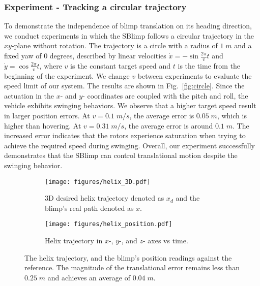 \documentclass[conference]{ieeeconf}
\begin{document}
\subsubsection{Experiment - Tracking a circular trajectory}
{
To demonstrate the independence of blimp translation on its heading direction, we conduct experiments in which the SBlimp follows a circular trajectory in the $xy$-plane without rotation. The trajectory is a circle with a radius of $1\; m$ and a fixed yaw of $0$ degrees, described by linear velocities $\dot x = -\sin{\frac{2\pi}{v}t}$ and $\dot y = \cos{\frac{2\pi}{v}t}$, where $v$ is the constant target speed and $t$ is the time from the beginning of the experiment.
We change $v$ between experiments to evaluate the speed limit of our system. 
The results are shown in Fig.~\ref{fig:circle}. 
%
Since the actuation in the $x$- and $y$- coordinates are coupled with the pitch and roll, the vehicle exhibits swinging behaviors. We observe that a higher target speed result in larger position errors. At $v = 0.1\; m/s$, the average error is $0.05\; m$, which is higher than hovering. At $v = 0.31\; m/s$, the average error is around $0.1\; m$. The increased error indicates that the rotors experience saturation when trying to achieve the required speed during swinging. 
%
Overall, our experiment successfully demonstrates that the SBlimp can control translational motion despite the swinging behavior.
}

\begin{figure}[t]
    \centering
    \begin{subfigure}{0.75\linewidth}
    \texttt{[image: figures/helix\_3D.pdf]}
    \caption{3D desired helix trajectory denoted as $x_d$ and the blimp's real path denoted as $x$.}
    \end{subfigure}
    \begin{subfigure}{1.\linewidth}
    \texttt{[image: figures/helix\_position.pdf]}
    \caption{Helix trajectory in $x$-, $y$-, and $z$- axes vs time.}
    \label{fig:helix_b}
    \end{subfigure}
    \caption{The helix trajectory, and the blimp's position readings against the reference. The magnitude of the translational error remains less than $0.25\; m$ and achieves an average of $0.04\; m$.}
    \label{fig:helix}
    \vspace{-1em}
\end{figure}
\end{document}
